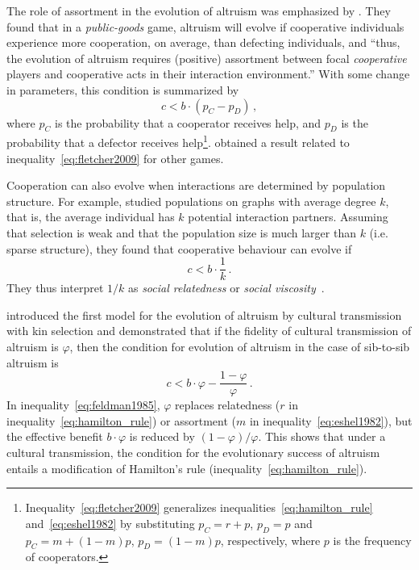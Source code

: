 \documentclass[12pt]{extarticle}
\begin{document}
The role of assortment in the evolution of altruism was emphasized by \citet{Fletcher2009assortment}.
They found that in a \emph{public-goods} game, altruism will evolve if cooperative individuals experience more cooperation, on average, than defecting individuals, and ``thus, the evolution of altruism requires (positive) assortment between focal \emph{cooperative} players and cooperative acts in their interaction environment.''
With some change in parameters, this condition is summarized by \citep[eq.~2.3]{Fletcher2009assortment}
\begin{equation} \label{eq:fletcher2009}
c < b \cdot (p_C - p_D ) \,,
\end{equation}
where $p_C$ is the probability that a cooperator receives help, and $p_D$ is the probability that a defector receives help\footnote{Inequality~\ref{eq:fletcher2009} generalizes inequalities~\ref{eq:hamilton_rule} and~\ref{eq:eshel1982} by substituting $p_C=r + p$, $p_D=p$ and $p_C=m + (1-m)p$, $p_D=(1-m)p$, respectively, where $p$ is the frequency of cooperators.}.
\citet{Bijma2010assortment} obtained a result related to inequality~\ref{eq:fletcher2009} for other games.

Cooperation can also evolve when interactions are determined by population structure. For example, \citet{Ohtsuki2006} studied populations on graphs with average degree $k$, that is, the average individual has $k$ potential interaction partners. Assuming that selection is weak and that the population size is much larger than $k$ (i.e. sparse structure), they found that cooperative behaviour can evolve if~\citep{Ohtsuki2006}
\begin{equation} \label{eq:ohtsuki2006}
c < b \cdot \frac{1}{k} \,.
\end{equation}
They thus interpret $1/k$ as \emph{social relatedness} or \emph{social viscosity}~\citep{Ohtsuki2006}.


\citet{feldman1985gene} introduced the first model for the evolution of altruism by cultural transmission with kin selection and demonstrated that if the fidelity of cultural transmission of altruism is $\varphi$, then the condition for evolution of altruism in the case of sib-to-sib altruism is \citep[Eq.~16]{feldman1985gene}
\begin{equation} \label{eq:feldman1985}
c < b \cdot \varphi - \frac{1-\varphi}{\varphi} \,.
\end{equation}
In inequality~\ref{eq:feldman1985}, $\varphi$ replaces relatedness ($r$ in inequality~\ref{eq:hamilton_rule}) or assortment ($m$ in inequality~\ref{eq:eshel1982}), but the effective benefit $b\cdot \varphi$ is  reduced by $(1-\varphi)/\varphi$.
This shows that under a cultural transmission, the condition for the evolutionary success of altruism entails a modification of Hamilton's rule (inequality~\ref{eq:hamilton_rule}).
\end{document}
